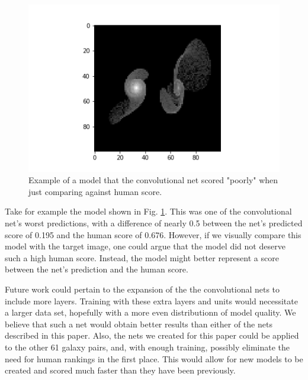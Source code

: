\documentclass[conference]{IEEEtran}
\begin{document}
\begin{figure}[htbp]
\centerline{\includegraphics[width=0.75\linewidth]{./Images/ConvHumanNoiseExample.png}}
\caption{Example of a model that the convolutional net scored "poorly" when just comparing against human score.}
\label{fig:ConvHumanNoiseExample}
\end{figure}

Take for example the model shown in Fig. \ref{fig:ConvHumanNoiseExample}. This was one of the convolutional net's worst predictions, with a difference of nearly 0.5 between the net's predicted score of 0.195 and the human score of 0.676. However, if we visually compare this model with the target image, one could argue that the model did not deserve such a high human score. Instead, the model might better represent a score between the net's prediction and the human score. 

Future work could pertain to the expansion of the the convolutional nets to include more layers. Training with these extra layers and units would necessitate a larger data set, hopefully with a more even distributionn of model quality. We believe that such a net would obtain better results than either of the nets described in this paper.  Also, the nets we created for this paper could be applied to the other 61 galaxy pairs, and, with enough training, possibly eliminate the need for human rankings in the first place. This would allow for new models to be created and scored much faster than they have been previously. 



\end{document}
